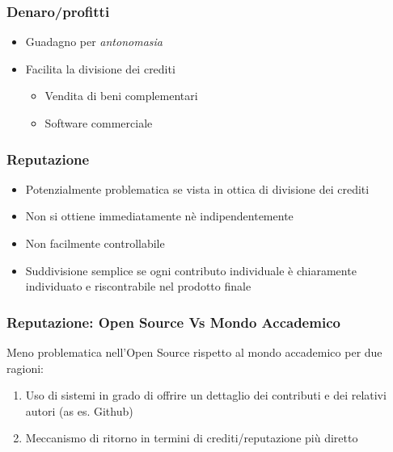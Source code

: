 \begin{frame}\frametitle{Denaro/profitti}

\begin{itemize}[<+->]
\itemsep1pt\parskip0pt
\item
  Guadagno per \emph{antonomasia}
\item
  Facilita la divisione dei crediti

  \begin{itemize}[<+->]
  \itemsep1pt\parskip0pt
  \item
    Vendita di beni complementari
  \item
    Software commerciale
  \end{itemize}
\end{itemize}

\end{frame}

\begin{frame}\frametitle{Reputazione}

\begin{itemize}[<+->]
\itemsep1pt\parskip0pt
\item
  Potenzialmente problematica se vista in ottica di divisione dei
  crediti
\item
  Non si ottiene immediatamente nè indipendentemente
\item
  Non facilmente controllabile
\item
  Suddivisione semplice se \alert{ogni} contributo individuale è
  \alert{chiaramente individuato} e riscontrabile nel prodotto finale
\end{itemize}

\end{frame}

\begin{frame}\frametitle{Reputazione:
\small{Open Source Vs Mondo Accademico}}

Meno problematica nell'Open Source rispetto al mondo accademico per due
ragioni:

\begin{enumerate}[<+->]
\def\labelenumi{\arabic{enumi}.}
\itemsep1pt\parskip0pt
\item
  Uso di sistemi in grado di offrire un dettaglio dei contributi e dei
  relativi autori (as es. Github)
\item
  Meccanismo di ritorno in termini di crediti/reputazione più diretto
\end{enumerate}

\end{frame}

